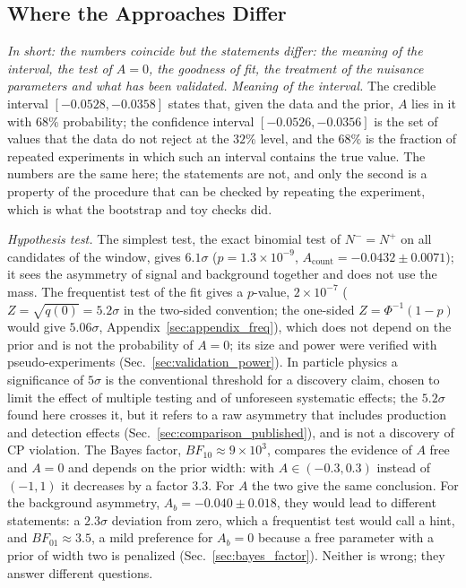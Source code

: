 \subsection{Where the Approaches Differ}
\label{sec:comparison_differ}
\emph{In short: the numbers coincide but the statements differ: the meaning of the interval, the test of $A=0$, the goodness of fit, the treatment of the nuisance parameters and what has been validated.}
\emph{Meaning of the interval.} The credible interval $[-0.0528,-0.0358]$ states that, given the data and the prior, $A$ lies in it with $68\%$ probability; the confidence interval $[-0.0526,-0.0356]$ is the set of values that the data do not reject at the $32\%$ level, and the $68\%$ is the fraction of repeated experiments in which such an interval contains the true value. The numbers are the same here; the statements are not, and only the second is a property of the procedure that can be checked by repeating the experiment, which is what the bootstrap and toy checks did.

\emph{Hypothesis test.} The simplest test, the exact binomial test of $N^-=N^+$ on all candidates of the window, gives $6.1\sigma$ ($p=1.3\times10^{-9}$, $A_{\mathrm{count}}=-0.0432\pm0.0071$); it sees the asymmetry of signal and background together and does not use the mass. The frequentist test of the fit gives a $p$-value, $2\times10^{-7}$ ($Z=\sqrt{q(0)}=5.2\sigma$ in the two-sided convention; the one-sided $Z=\Phi^{-1}(1-p)$ would give $5.06\sigma$, Appendix~\ref{sec:appendix_freq}), which does not depend on the prior and is not the probability of $A=0$; its size and power were verified with pseudo-experiments (Sec.~\ref{sec:validation_power}). In particle physics a significance of $5\sigma$ is the conventional threshold for a discovery claim, chosen to limit the effect of multiple testing and of unforeseen systematic effects; the $5.2\sigma$ found here crosses it, but it refers to a raw asymmetry that includes production and detection effects (Sec.~\ref{sec:comparison_published}), and is not a discovery of CP violation. The Bayes factor, $BF_{10}\approx9\times10^3$, compares the evidence of $A$ free and $A=0$ and depends on the prior width: with $A\in(-0.3,0.3)$ instead of $(-1,1)$ it decreases by a factor $3.3$. For $A$ the two give the same conclusion. For the background asymmetry, $A_b=-0.040\pm0.018$, they would lead to different statements: a $2.3\sigma$ deviation from zero, which a frequentist test would call a hint, and $BF_{01}\approx3.5$, a mild preference for $A_b=0$ because a free parameter with a prior of width two is penalized (Sec.~\ref{sec:bayes_factor}). Neither is wrong; they answer different questions.

